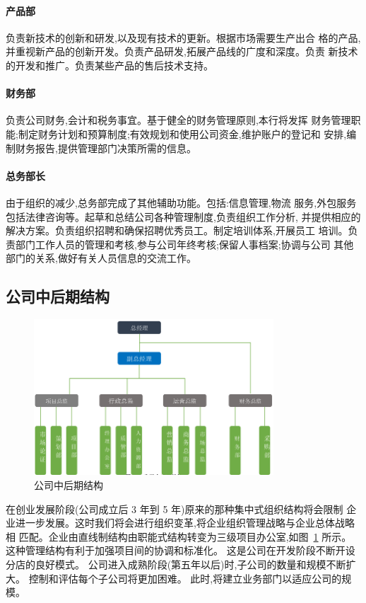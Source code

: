 \paragraph{产品部}
负责新技术的创新和研发,以及现有技术的更新。根据市场需要生产出合
格的产品,并重视新产品的创新开发。负责产品研发,拓展产品线的广度和深度。负责
新技术的开发和推广。负责某些产品的售后技术支持。
\paragraph{财务部}
负责公司财务,会计和税务事宜。基于健全的财务管理原则,本行将发挥
财务管理职能;制定财务计划和预算制度;有效规划和使用公司资金,维护账户的登记和
安排,编制财务报告,提供管理部门决策所需的信息。
\paragraph{总务部长}
由于组织的减少,总务部完成了其他辅助功能。包括:信息管理,物流
服务,外包服务包括法律咨询等。起草和总结公司各种管理制度,负责组织工作分析,
并提供相应的解决方案。负责组织招聘和确保招聘优秀员工。制定培训体系,开展员工
培训。负责部门工作人员的管理和考核,参与公司年终考核;保留人事档案;协调与公司
其他部门的关系,做好有关人员信息的交流工作。

\subsection{公司中后期结构}
\begin{figure}[htbp]
\centering
\label{figure:late-struct}
\includegraphics[width=0.8\textwidth]{../images/company/后期结构}
\caption{公司中后期结构}
\end{figure}

在创业发展阶段(公司成立后 3 年到 5 年)原来的那种集中式组织结构将会限制
企业进一步发展。这时我们将会进行组织变革,将企业组织管理战略与企业总体战略相
匹配。企业由直线制结构由职能式结构转变为三级项目办公室,如图~\ref{figure:late-struct}
所示。 这种管理结构有利于加强项目间的协调和标准化。 这是公司在开发阶段不断开设
分店的良好模式。 公司进入成熟阶段(第五年以后)时,子公司的数量和规模不断扩
大。 控制和评估每个子公司将更加困难。 此时,将建立业务部门以适应公司的规模。

